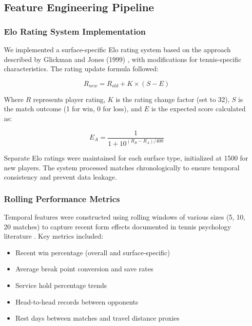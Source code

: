 \documentclass[11pt,a4paper]{article}
\begin{document}
\subsection{Feature Engineering Pipeline}

\subsubsection{Elo Rating System Implementation}

We implemented a surface-specific Elo rating system based on the approach described by Glickman and Jones (1999) \citep{glickman1999rating}, with modifications for tennis-specific characteristics. The rating update formula followed:

\begin{equation}
R_{new} = R_{old} + K \times (S - E)
\end{equation}

Where $R$ represents player rating, $K$ is the rating change factor (set to 32), $S$ is the match outcome (1 for win, 0 for loss), and $E$ is the expected score calculated as:

\begin{equation}
E_A = \frac{1}{1 + 10^{(R_B - R_A) / 400}}
\end{equation}

Separate Elo ratings were maintained for each surface type, initialized at 1500 for new players. The system processed matches chronologically to ensure temporal consistency and prevent data leakage.

\subsubsection{Rolling Performance Metrics}

Temporal features were constructed using rolling windows of various sizes (5, 10, 20 matches) to capture recent form effects documented in tennis psychology literature \citep{gomez2017impact}. Key metrics included:

\begin{itemize}
    \item Recent win percentage (overall and surface-specific)
    \item Average break point conversion and save rates
    \item Service hold percentage trends
    \item Head-to-head records between opponents
    \item Rest days between matches and travel distance proxies
\end{itemize}
\end{document}
